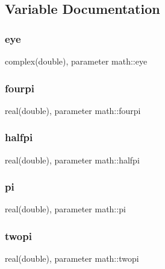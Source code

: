 \subsection{Variable Documentation}
\mbox{\label{namespacemath_ae0354610846d49064ea0336f19d5bf3f}} 
\subsubsection{\texorpdfstring{eye}{eye}}
{\footnotesize\ttfamily complex(double), parameter math\+::eye}

\mbox{\label{namespacemath_a83cddb754967ada1a15217d10ed9c24b}} 
\subsubsection{\texorpdfstring{fourpi}{fourpi}}
{\footnotesize\ttfamily real(double), parameter math\+::fourpi}

\mbox{\label{namespacemath_a99d72d3bce2cadc8630d10ee09aaa3ea}} 
\subsubsection{\texorpdfstring{halfpi}{halfpi}}
{\footnotesize\ttfamily real(double), parameter math\+::halfpi}

\mbox{\label{namespacemath_aa2f838077707f6cdb0c8a0ec69719690}} 
\subsubsection{\texorpdfstring{pi}{pi}}
{\footnotesize\ttfamily real(double), parameter math\+::pi}

\mbox{\label{namespacemath_aeb6d7ed6a20444e26f024b34eaa4c4f7}} 
\subsubsection{\texorpdfstring{twopi}{twopi}}
{\footnotesize\ttfamily real(double), parameter math\+::twopi}

